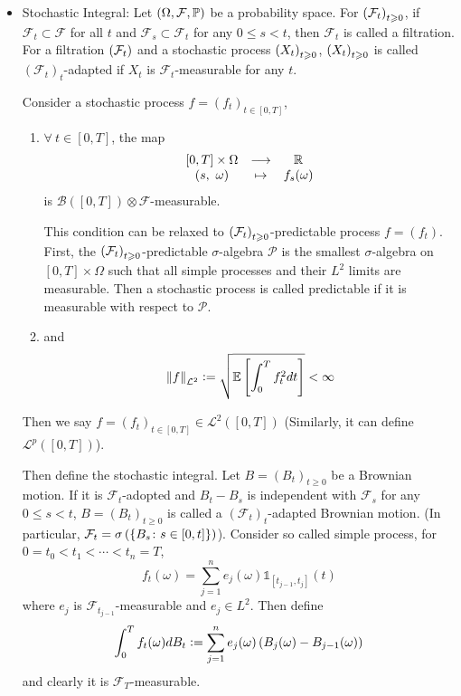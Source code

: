 \documentclass[a4paper,12pt]{article}
\begin{document}
\begin{itemize}
  \item Stochastic Integral: Let $(\Omega, \mathcal{F}, \mathbb{P})$ be a probability space. For $\left(\mathcal{F}_t\right)_{t\geqslant 0}$, if $\mathcal{F}_t \subset \mathcal{F}$ for all $t$ and $\mathcal{F}_s \subset \mathcal{F}_t$ for any $0\leqslant s < t$, then $\mathcal{F}_t$ is called a filtration. For a filtration $\left(\mathcal{F}_t\right)$ and a stochastic process $\left(X_t\right)_{t\geqslant 0}$, $\left(X_t\right)_{t\geqslant 0}$ is called $(\mathcal{F}_t)_t$-adapted if $X_t$ is $\mathcal{F}_t$-measurable for any $t$.

  \noindent Consider a stochastic process $f = (f_t)_{t \in [0,T]}$,
  \begin{enumerate}[label=(\arabic*)]
    \item $\forall~t \in [0,T]$, the map
    \begin{equation*}
      \begin{array}{ccc}
        [0,T] \times \Omega &\longrightarrow & \mathbb{R} \\
        (s,~\omega) &\mapsto & f_s(\omega)
      \end{array}
    \end{equation*}
    is $\mathcal{B}([0,T])\otimes \mathcal{F}$-measurable. 
    \begin{rmk}
      This condition can be relaxed to $\left(\mathcal{F}_t\right)_{t\geqslant 0}$-predictable process $f = (f_t)$. First, the  $\left(\mathcal{F}_t\right)_{t\geqslant 0}$-predictable $\sigma$-algebra $\mathcal{P}$ is the smallest $\sigma$-algebra on $[0,T] \times \Omega$ such that all simple processes and their $L^2$ limits are measurable. Then a stochastic process is called predictable if it is measurable with respect to $\mathcal{P}$.
    \end{rmk}
    \item and
    \begin{equation*}
      \left\lVert f\right\lVert_{\mathcal{L}^2} \vcentcolon= \sqrt{\mathbb{E}\left[\int_0^Tf_t^2dt\right]} < \infty
    \end{equation*}
  \end{enumerate}
  Then we say $f=(f_t)_{t \in [0,T]} \in \mathcal{L}^2([0,T])$ (Similarly, it can define $\mathcal{L}^p([0,T])$).

  \noindent Then define the stochastic integral. Let $B=(B_t)_{t \geqslant 0}$ be a Brownian motion. If it is $\mathcal{F}_t$-adopted and $B_t - B_s$ is independent with $\mathcal{F}_s$ for any $0\leqslant s < t$, $B=(B_t)_{t \geqslant 0}$ is called a $(\mathcal{F}_t)_t$-adapted Brownian motion. (In particular, $\mathcal{F}_t = \sigma\left(\left\{B_s \colon s \in [0,t]\right\}\right)$). Consider so called simple process, for $0=t_0<t_1<\cdots <t_n =T$,
  \begin{equation*}
    f_t(\omega) = \sum_{j=1}^n e_j(\omega)\mathds{1}_{[t_{j-1}, t_j]}(t)
  \end{equation*}
  where $e_j$ is $\mathcal{F}_{t_{j-1}}$-measurable and $e_j \in L^2$. Then define
  \begin{equation*}
    \int_0^Tf_t(\omega)dB_t \vcentcolon= \sum_{j=1}^n e_j(\omega)\left(B_j(\omega) - B_{j-1}(\omega)\right)
  \end{equation*}
  and clearly it is $\mathcal{F}_T$-measurable.


\end{itemize}
\end{document}
